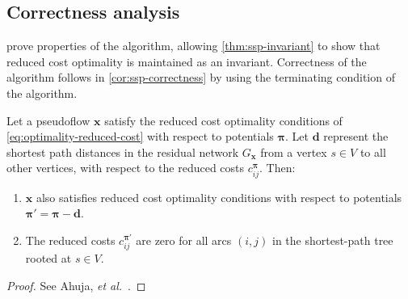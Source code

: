 \subsection{Correctness analysis} \label{appendix:impl-ssp:analysis-correctness}

 prove properties of the algorithm, allowing \cref{thm:ssp-invariant} to show that reduced cost optimality is maintained as an invariant. Correctness of the algorithm follows in \cref{cor:ssp-correctness} by using the terminating condition of the algorithm.\\

\begin{lemma} \label{lemma:ssp-reduced-costs}
    Let a pseudoflow $\mathbf{x}$ satisfy the reduced cost optimality conditions of \cref{eq:optimality-reduced-cost} with respect to potentials $\boldsymbol{\pi}$. Let $\mathbf{d}$ represent the shortest path distances in the residual network $G_{\mathbf{x}}$ from a vertex $s \in V$ to all other vertices, with respect to the reduced costs $c^{\boldsymbol{\pi}}_{ij}$. Then:
    
    \begin{enumerate}[label=(\alph*)]
        \item $\mathbf{x}$ also satisfies reduced cost optimality conditions with respect to potentials $\boldsymbol{\pi}' = \boldsymbol{\pi} - \mathbf{d}$.
        \item The reduced costs $c^{\boldsymbol{\pi}'}_{ij}$ are zero for all arcs $(i,j)$ in the shortest-path tree rooted at $s \in V$.
    \end{enumerate}
\end{lemma}
\begin{proof}
    See Ahuja, \textit{et al.}~\cite[lemma~9.11]{Ahuja:1993}.
\end{proof}

